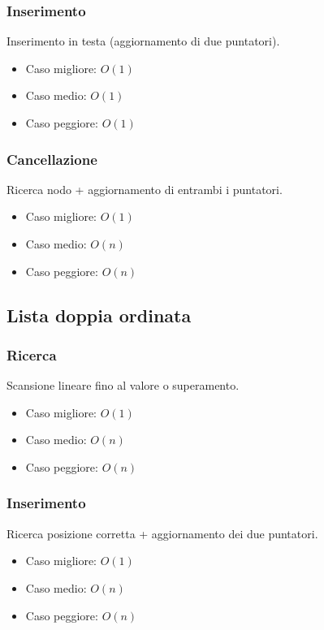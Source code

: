 \documentclass[a4paper,12pt]{article}
\begin{document}
\subsubsection{Inserimento}
Inserimento in testa (aggiornamento di due puntatori).
\begin{itemize}
    \item Caso migliore: $O(1)$
    \item Caso medio: $O(1)$
    \item Caso peggiore: $O(1)$
\end{itemize}

\subsubsection{Cancellazione}
Ricerca nodo + aggiornamento di entrambi i puntatori.
\begin{itemize}
    \item Caso migliore: $O(1)$
    \item Caso medio: $O(n)$
    \item Caso peggiore: $O(n)$
\end{itemize}


\subsection{Lista doppia ordinata}

\subsubsection{Ricerca}
Scansione lineare fino al valore o superamento.
\begin{itemize}
    \item Caso migliore: $O(1)$
    \item Caso medio: $O(n)$
    \item Caso peggiore: $O(n)$
\end{itemize}

\subsubsection{Inserimento}
Ricerca posizione corretta + aggiornamento dei due puntatori.
\begin{itemize}
    \item Caso migliore: $O(1)$
    \item Caso medio: $O(n)$
    \item Caso peggiore: $O(n)$
\end{itemize}
\end{document}
